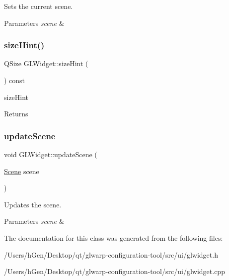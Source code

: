 Sets the current scene. 


\begin{DoxyParams}{Parameters}
{\em scene} & \\
\hline
\end{DoxyParams}
\mbox{\label{class_g_l_widget_af04a97931fb78d610e1c73d7c4887319}} 
\subsubsection{\texorpdfstring{size\+Hint()}{sizeHint()}}
{\footnotesize\ttfamily Q\+Size G\+L\+Widget\+::size\+Hint (\begin{DoxyParamCaption}{ }\end{DoxyParamCaption}) const\hspace{0.3cm}{\ttfamily [override]}}



size\+Hint 

\begin{DoxyReturn}{Returns}

\end{DoxyReturn}
\mbox{\label{class_g_l_widget_a75a7f63bf253007d7dcbeee402e963d1}} 
\subsubsection{\texorpdfstring{update\+Scene}{updateScene}}
{\footnotesize\ttfamily void G\+L\+Widget\+::update\+Scene (\begin{DoxyParamCaption}\item[{\mbox{\hyperlink{class_scene}{Scene}}}]{scene }\end{DoxyParamCaption})\hspace{0.3cm}{\ttfamily [signal]}}



Updates the scene. 


\begin{DoxyParams}{Parameters}
{\em scene} & \\
\hline
\end{DoxyParams}


The documentation for this class was generated from the following files\+:\begin{DoxyCompactItemize}
\item 
/\+Users/h\+Gen/\+Desktop/qt/glwarp-\/configuration-\/tool/src/ui/glwidget.\+h\item 
/\+Users/h\+Gen/\+Desktop/qt/glwarp-\/configuration-\/tool/src/ui/glwidget.\+cpp\end{DoxyCompactItemize}
